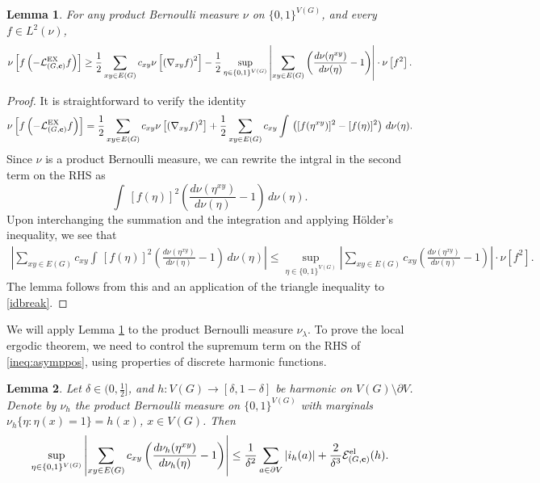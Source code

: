 \documentclass[11pt]{amsart}
\theoremstyle{plain}
\newtheorem{lemma}{Lemma}[section]
\theoremstyle{definition}
\theoremstyle{remark}
\begin{document}
\begin{lemma}
\label{lem:asymppos}
For any product Bernoulli measure $\nu$ on $\{0,1\}^{V(G)}$, and every $f\in L^2(\nu)$,
\begin{align}
\label{ineq:asymppos}
\nu\left[f\left(-\mathcal{L}^{\rm EX}_{(G,{\bf c})} f\right)\right] \geq \frac{1}{2} \sum_{xy\in E(G)} c_{xy} \nu\left[\left(\nabla_{xy} f\right)^2\right]-\frac{1}{2}\sup_{\eta\in \{0,1\}^{V(G)}} \left|\sum_{xy\in E(G)} \left(\frac{d\nu(\eta^{xy})}{d\nu(\eta)}-1\right) \right| \cdot \nu\left[f^2\right] .
\end{align}
\end{lemma}

\begin{proof}
It is straightforward to verify the identity
\begin{align}
\label{idbreak}
\nu\left[f\left(-\mathcal{L}^{\rm EX}_{(G,{\bf c})} f\right)\right] = \frac{1}{2} \sum_{xy\in E(G)} c_{xy} \nu\left[(\nabla_{xy} f)^2\right] + \frac{1}{2} \sum_{xy\in E(G)}c_{xy} \int\,\left([f(\eta^{xy})]^2 - [f(\eta)]^2\right)\, d\nu(\eta).
\end{align}
Since $\nu$ is a product Bernoulli measure, we can rewrite the intgral in the second term on the RHS as
\[
\int\, [f(\eta)]^2 \left(\frac{d\nu(\eta^{xy})}{d\nu(\eta)}-1\right)\,d\nu(\eta).
\]
Upon interchanging the summation and the integration and applying H\"{o}lder's inequality, we see that
\begin{align*}
\left|\sum_{xy\in E(G)} c_{xy}\int\, [f(\eta)]^2 \left(\frac{d\nu(\eta^{xy})}{d\nu(\eta)}-1\right)\,d\nu(\eta)\right| \leq \sup_{\eta\in \{0,1\}^{V(G)}} \left|\sum_{xy\in E(G)} c_{xy} \left(\frac{d\nu(\eta^{xy})}{d\nu(\eta)}-1\right) \right| \cdot \nu\left[f^2\right].
\end{align*}
The lemma follows from this and an application of the triangle inequality to \eqref{idbreak}.
\end{proof}

We will apply Lemma \ref{lem:asymppos} to the product Bernoulli measure $\nu_\lambda$. To prove the local ergodic theorem, we need to control the supremum term on the RHS of \eqref{ineq:asymppos}, using properties of discrete harmonic functions.

\begin{lemma}
\label{lem:RDPT}
Let $\delta \in (0, \frac{1}{2}]$, and $h: V(G)\to[\delta,1-\delta]$ be harmonic on $V(G)\setminus \partial V$. Denote by $\nu_h$ the product Bernoulli measure on $\{0,1\}^{V(G)}$ with marginals $\nu_h\{\eta: \eta(x)=1\} = h(x)$, $x\in V(G)$. Then
\begin{align}
\label{SigmaN}
\sup_{\eta\in \{0,1\}^{V(G)}} \left|\sum_{xy\in E(G)} c_{xy} \left(\frac{d\nu_h(\eta^{xy})}{d\nu_h(\eta)}-1 \right) \right| \leq \frac{1}{\delta^2} \sum_{a\in \partial V} |i_h(a)| + \frac{2}{\delta^3} \mathcal{E}^{\rm el}_{(G,{\bf c})}(h).
\end{align}
\end{lemma}
\end{document}
